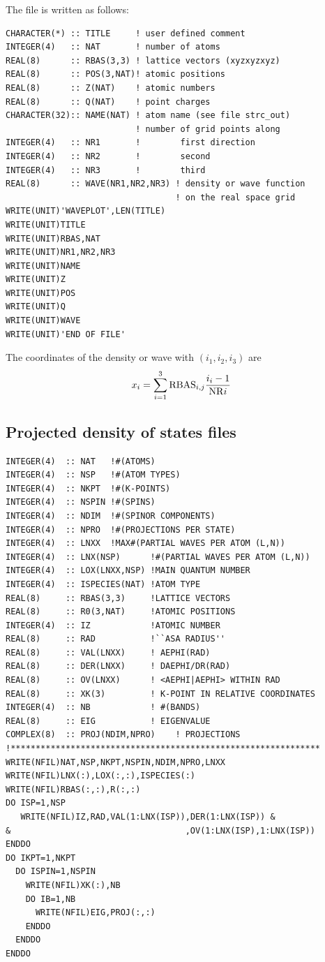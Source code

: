 \documentclass[final,12pt]{article}
\begin{document}
The file is written as follows:
\small{
\begin{verbatim}
CHARACTER(*) :: TITLE     ! user defined comment
INTEGER(4)   :: NAT       ! number of atoms
REAL(8)      :: RBAS(3,3) ! lattice vectors (xyzxyzxyz)
REAL(8)      :: POS(3,NAT)! atomic positions
REAL(8)      :: Z(NAT)    ! atomic numbers 
REAL(8)      :: Q(NAT)    ! point charges
CHARACTER(32):: NAME(NAT) ! atom name (see file strc_out)
                          ! number of grid points along 
INTEGER(4)   :: NR1       !        first direction
INTEGER(4)   :: NR2       !        second
INTEGER(4)   :: NR3       !        third
REAL(8)      :: WAVE(NR1,NR2,NR3) ! density or wave function 
                                  ! on the real space grid
WRITE(UNIT)'WAVEPLOT',LEN(TITLE)
WRITE(UNIT)TITLE
WRITE(UNIT)RBAS,NAT
WRITE(UNIT)NR1,NR2,NR3
WRITE(UNIT)NAME
WRITE(UNIT)Z
WRITE(UNIT)POS
WRITE(UNIT)Q
WRITE(UNIT)WAVE
WRITE(UNIT)'END OF FILE'
\end{verbatim}
}

The coordinates of the density or wave with $(i_1,i_2,i_3)$ are 
\begin{equation}
  x_i=\sum_{i=1}^{3} {\rm RBAS}_{i,j}{{i_i-1}\over{{\rm NR}i}} 
\end{equation}

\subsection{Projected density of states files}
\begin{verbatim}
INTEGER(4)  :: NAT   !#(ATOMS)
INTEGER(4)  :: NSP   !#(ATOM TYPES)
INTEGER(4)  :: NKPT  !#(K-POINTS)
INTEGER(4)  :: NSPIN !#(SPINS)
INTEGER(4)  :: NDIM  !#(SPINOR COMPONENTS)
INTEGER(4)  :: NPRO  !#(PROJECTIONS PER STATE)
INTEGER(4)  :: LNXX  !MAX#(PARTIAL WAVES PER ATOM (L,N))
INTEGER(4)  :: LNX(NSP)      !#(PARTIAL WAVES PER ATOM (L,N))
INTEGER(4)  :: LOX(LNXX,NSP) !MAIN QUANTUM NUMBER
INTEGER(4)  :: ISPECIES(NAT) !ATOM TYPE
REAL(8)     :: RBAS(3,3)     !LATTICE VECTORS
REAL(8)     :: R0(3,NAT)     !ATOMIC POSITIONS 
INTEGER(4)  :: IZ            !ATOMIC NUMBER
REAL(8)     :: RAD           !``ASA RADIUS''
REAL(8)     :: VAL(LNXX)     ! AEPHI(RAD)
REAL(8)     :: DER(LNXX)     ! DAEPHI/DR(RAD)
REAL(8)     :: OV(LNXX)      ! <AEPHI|AEPHI> WITHIN RAD
REAL(8)     :: XK(3)         ! K-POINT IN RELATIVE COORDINATES
INTEGER(4)  :: NB            ! #(BANDS)
REAL(8)     :: EIG           ! EIGENVALUE
COMPLEX(8)  :: PROJ(NDIM,NPRO)    ! PROJECTIONS
!**************************************************************
WRITE(NFIL)NAT,NSP,NKPT,NSPIN,NDIM,NPRO,LNXX
WRITE(NFIL)LNX(:),LOX(:,:),ISPECIES(:)
WRITE(NFIL)RBAS(:,:),R(:,:)
DO ISP=1,NSP
   WRITE(NFIL)IZ,RAD,VAL(1:LNX(ISP)),DER(1:LNX(ISP)) &
&                                   ,OV(1:LNX(ISP),1:LNX(ISP))
ENDDO
DO IKPT=1,NKPT
  DO ISPIN=1,NSPIN
    WRITE(NFIL)XK(:),NB
    DO IB=1,NB
      WRITE(NFIL)EIG,PROJ(:,:)
    ENDDO
  ENDDO
ENDDO
\end{verbatim}
\end{document}
